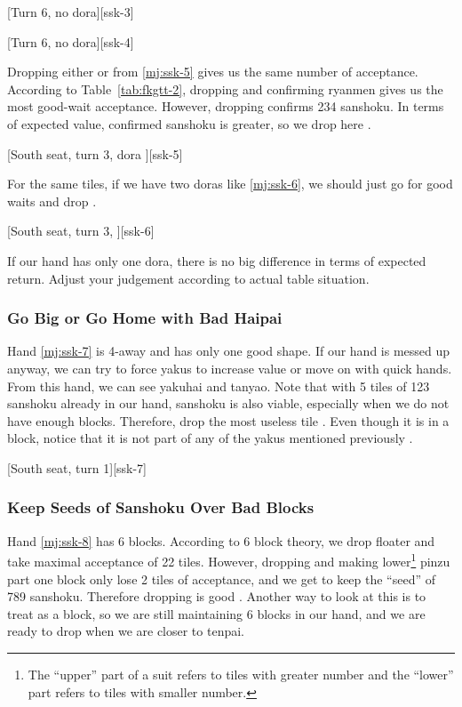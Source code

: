 \documentclass[12pt]{article}
\begin{document}
[Turn 6, no dora][ssk-3]

[Turn 6, no dora][ssk-4]

Dropping either  or  from \ref{mj:ssk-5} gives us the same number of acceptance. According to Table~\ref{tab:fkgtt-2}, dropping  and confirming ryanmen gives us the most good-wait acceptance. However, dropping  confirms 234 sanshoku. In terms of expected value, confirmed sanshoku is greater, so we drop  here \citep[][p.~65]{zero-teyaku}.

[South seat, turn 3, dora ][ssk-5]

For the same tiles, if we have two doras like \ref{mj:ssk-6}, we should just go for good waits and drop  \citep[][p.~65]{zero-teyaku}.

[South seat, turn 3, ][ssk-6]

If our hand has only one dora, there is no big difference in terms of expected return. Adjust your judgement according to actual table situation.


\subsubsection*{Go Big or Go Home with Bad Haipai}

Hand \ref{mj:ssk-7} is 4-away and has only one good shape. If our hand is messed up anyway, we can try to force yakus to increase value or move on with quick hands. From this hand, we can see yakuhai and tanyao. Note that with 5 tiles of 123 sanshoku already in our hand, sanshoku is also viable, especially when we do not have enough blocks. Therefore, drop the most useless tile . Even though it is in a  block, notice that it is not part of any of the yakus mentioned previously \citep[][p.~64]{zero-teyaku}.

[South seat, turn 1][ssk-7]


\subsubsection*{Keep Seeds of Sanshoku Over Bad Blocks}

Hand \ref{mj:ssk-8} has 6 blocks. According to 6 block theory, we drop floater  and take maximal acceptance of 22 tiles. However, dropping  and making lower\footnote{The ``upper'' part of a suit refers to tiles with greater number and the ``lower'' part refers to tiles with smaller number.} pinzu part one block only lose 2 tiles of acceptance, and we get to keep the ``seed'' of 789 sanshoku. Therefore dropping  is good \citep[][p.~64]{zero-teyaku}. Another way to look at this is to treat  as a block, so we are still maintaining 6 blocks in our hand, and we are ready to drop  when we are closer to tenpai.
\end{document}

